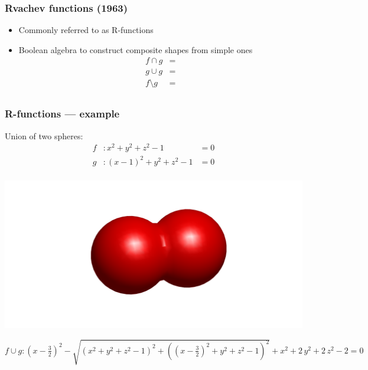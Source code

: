 \documentclass{beamer}
\begin{document}
\begin{frame}[t] 
\frametitle{Rvachev functions (1963)} 
\begin{itemize} 
\item Commonly referred to as R-functions 
\item Boolean algebra to construct composite shapes from simple ones 
\[
    \begin{aligned}
    f \cap g &=        \\ 
    g \cup g &=        \\
    f \setminus g &=   \\
    \end{aligned}
\]
\end{itemize} 
\end{frame}
\begin{frame}[t] 
\frametitle{R-functions --- example} 
Union of two spheres:
\[
   \begin{aligned}
   f&: x^2+y^2+z^2 - 1 &= 0 \\
   g&: (x-1)^2+y^2+z^2 - 1 &= 0 \\
   \end{aligned}
\]


\begin{center}
{\tiny
\centerline{\includegraphics[width = 0.75\linewidth]{./figs/TwoSpheres}} 
\vspace{-3mm}
$
f \cup g: {\left(x-\frac{3}{2}\right)}^2-\sqrt{{\left(x^2+y^2+z^2-1\right)}^2+{\left({\left(x-\frac{3}{2}\right)}^2+y^2+z^2-1\right)}^2}+x^2+2\,y^2+2\,z^2-2 = 0$ 
}
\end{center}
\end{frame} 
\end{document}
